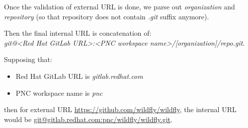 \documentclass[../main.tex]{subfiles}
\begin{document}
Once the validation of external URL is done, we parse out \textit{organization} and \textit{repository} (so that repository does not contain \textit{.git} suffix anymore).

Then the final internal URL is concatenation of:\\
\textit{git@<Red Hat GitLab URL>:<PNC workspace name>/[organization]/repo.git}.

Supposing that:
\begin{itemize}
    \item Red Hat GitLab URL is \textit{gitlab.redhat.com}

    \item PNC workspace name is \textit{pnc}
\end{itemize}

then for external URL \url{https://github.com/wildfly/wildfly}, the internal URL would be \url{git@gitlab.redhat.com:pnc/wildfly/wildfly.git}.
\end{document}
